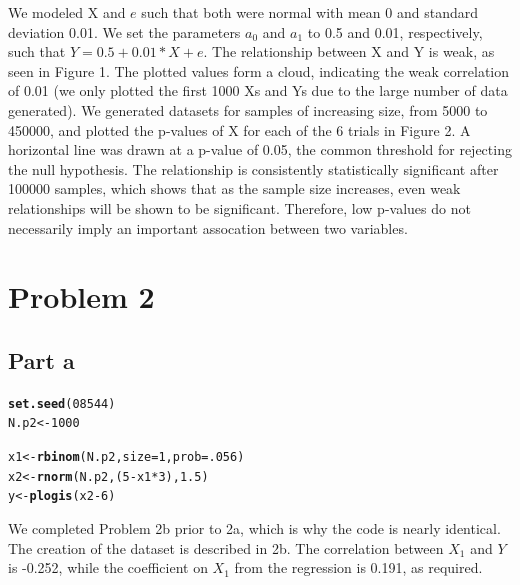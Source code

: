 \documentclass{article}\usepackage[]{graphicx}\usepackage[]{color}
\makeatletter
\newcommand{\hlnum}[1]{\textcolor[rgb]{0.686,0.059,0.569}{#1}}%
\newcommand{\hlopt}[1]{\textcolor[rgb]{0,0,0}{#1}}%
\newcommand{\hlstd}[1]{\textcolor[rgb]{0.345,0.345,0.345}{#1}}%
\newcommand{\hlkwb}[1]{\textcolor[rgb]{0.69,0.353,0.396}{#1}}%
\newcommand{\hlkwc}[1]{\textcolor[rgb]{0.333,0.667,0.333}{#1}}%
\newcommand{\hlkwd}[1]{\textcolor[rgb]{0.737,0.353,0.396}{\textbf{#1}}}%
\newenvironment{kframe}{%
 \def\at@end@of@kframe{}%
 \ifinner\ifhmode%
  \def\at@end@of@kframe{\end{minipage}}%
  \begin{minipage}{\columnwidth}%
 \fi\fi%
 \def\FrameCommand##1{\hskip\@totalleftmargin \hskip-\fboxsep
 \colorbox{shadecolor}{##1}\hskip-\fboxsep
     \hskip-\linewidth \hskip-\@totalleftmargin \hskip\columnwidth}%
 \MakeFramed {\advance\hsize-\width
   \@totalleftmargin\z@ \linewidth\hsize
   \@setminipage}}%
 {\par\unskip\endMakeFramed%
 \at@end@of@kframe}
\newenvironment{knitrout}{}{} %
\makeatother
\begin{document}
\begin{center}
\begin{knitrout}
\end{knitrout}
\end{center}

\noindent We modeled X and $e$ such that both were normal with mean 0 and standard deviation 0.01. We set the parameters $a_{0}$ and $a_{1}$ to 0.5 and 0.01, respectively, such that $Y = 0.5 + 0.01*X + e$. The relationship between X and Y is weak, as seen in Figure 1. The plotted values form a cloud, indicating the weak correlation of 0.01 (we only plotted the first 1000 Xs and Ys due to the large number of data generated).  We generated datasets for samples of increasing size, from 5000 to 450000, and plotted the p-values of X for each of the $6$ trials in Figure 2. A horizontal line was drawn at a p-value of 0.05, the common threshold for rejecting the null hypothesis. The relationship is consistently statistically significant after 100000 samples, which shows that as the sample size increases, even weak relationships will be shown to be significant. Therefore, low p-values do not necessarily imply an important assocation between two variables. \\

\section*{Problem 2}
\subsection*{Part a}
\begin{knitrout}
\color{fgcolor}\begin{kframe}
\begin{alltt}
\hlkwd{set.seed}\hlstd{(}\hlnum{08544}\hlstd{)}
\hlstd{N.p2} \hlkwb{<-} \hlnum{1000}

\hlstd{x1} \hlkwb{<-} \hlkwd{rbinom}\hlstd{(N.p2,} \hlkwc{size} \hlstd{=} \hlnum{1}\hlstd{,} \hlkwc{prob} \hlstd{=} \hlnum{.056}\hlstd{)}
\hlstd{x2} \hlkwb{<-} \hlkwd{rnorm}\hlstd{(N.p2, (}\hlnum{5} \hlopt{-} \hlstd{x1}\hlopt{*}\hlnum{3}\hlstd{),} \hlnum{1.5}\hlstd{)}
\hlstd{y} \hlkwb{<-} \hlkwd{plogis}\hlstd{(x2} \hlopt{-} \hlnum{6}\hlstd{)}
\end{alltt}
\end{kframe}
\end{knitrout}
\noindent We completed Problem 2b prior to 2a, which is why the code is nearly identical. The creation of the dataset is described in 2b. The correlation between $X_{1}$ and $Y$ is -0.252, while the coefficient on $X_{1}$ from the regression is 0.191, as required.\\ 
\end{document}
